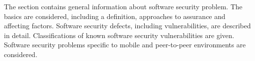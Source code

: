 %
The section contains general information about software security problem. 
%
The basics are considered, including a definition, approaches to assurance and affecting factors. 
%
Software security defects, including vulnerabilities, are described in detail. 
%
Classifications of known software security vulnerabilities are given. 
%
Software security problems specific to mobile and peer-to-peer environments are considered. 